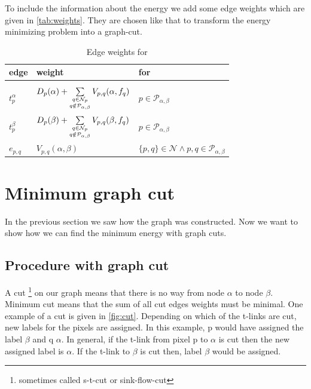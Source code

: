 \documentclass[runningheads,a4paper]{llncs}
\begin{document}
        \noindent 
        To include the information about the energy we add some edge weights which are given in \autoref{tab:weights}. 
        They are chosen like that to transform the energy minimizing problem into a graph-cut.
        \begin{table}[h]
            \centering
            \begin{tabular}{l l l}
                \textbf{edge}       & \textbf{weight}       & \textbf{for}\\[0.2cm]
                \hline \\[0.2cm]
                $t_p^\alpha$ \phantom{basdsadalub}        & $D_p(\alpha) + \sum\limits_{\small \substack{q \in \mathcal{N}_p \\q \notin \mathcal{P}_{\alpha,\beta}}} V_{p,q}(\alpha,f_q)$ \phantom{blubdasdsad} & $p \in \mathcal{P}_{\alpha,\beta}$ \\[0.9cm]
                $t_p^\beta$ \phantom{blub}        & $D_p(\beta) + \sum\limits_{\small \substack{q \in \mathcal{N}_p \\q \notin \mathcal{P}_{\alpha,\beta}}} V_{p,q}(\beta,f_q)$  & $p \in \mathcal{P}_{\alpha,\beta}$ \\[0.9cm]
                $e_{p,q}$    & $V_{p,q}(\alpha,\beta)$     & $\{p,q\} \in \mathcal{N} \wedge p,q \in \mathcal{P}_{\alpha,\beta}$
                \\[0.5cm] \hline
            \end{tabular}
            \caption{Edge weights for \abswap}
            \label{tab:weights}
        \end{table}
        

\section{Minimum graph cut}
    In the previous section we saw how the graph was constructed. Now we want to show how we can find the minimum energy with graph cuts.
    
    \subsection{Procedure with graph cut}
        A cut \footnote{sometimes called s-t-cut or sink-flow-cut} on our graph means that there is no way from node $\alpha$ to node $\beta$. Minimum cut means that the sum of all cut edges weights must be minimal.
        One example of a cut is given in \autoref{fig:cut}. Depending on which of the t-links are cut, new labels for the pixels are assigned. In this example, p would have assigned the label $\beta$ and q $\alpha$. 
        In general, if the t-link from pixel p to $\alpha$ is cut then the new assigned label is $\alpha$. If the t-link to $\beta$ is cut then, label $\beta$ would be assigned.
\end{document}
